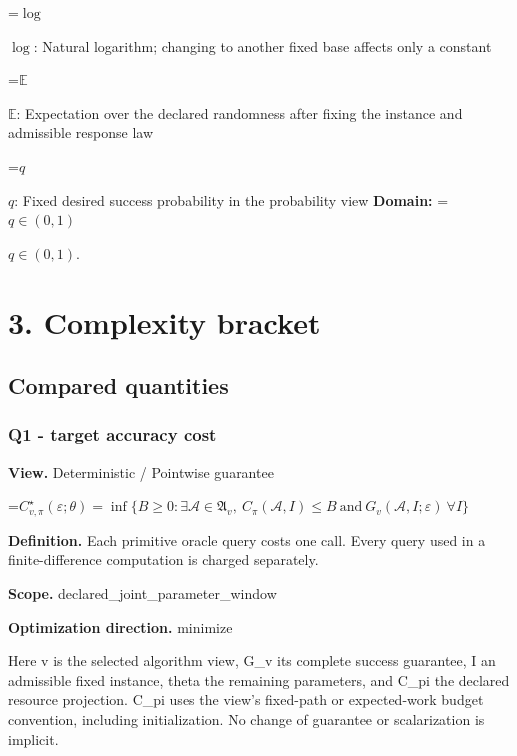 \documentclass[10pt,a4paper]{article}
\newcommand{\AtlasMath}[1]{\par\begingroup\centering\setbox0=\hbox{$\displaystyle #1$}\ifdim\wd0>1.4\linewidth\typeout{ATLAS WIDE FORMULA: \the\wd0}\fi\ifdim\wd0>\linewidth\resizebox{\linewidth}{!}{\box0}\else\box0\fi\par\endgroup}
\newcommand{\AtlasInlineMath}[1]{\begingroup\setbox0=\hbox{$#1$}\ifdim\wd0>.4\linewidth\endgroup\AtlasMath{#1}\else\endgroup$#1$\fi}
\begin{document}
\AtlasInlineMath{\log}: Natural logarithm; changing to another fixed base affects only a constant



\AtlasInlineMath{\mathbb{E}}: Expectation over the declared randomness after fixing the instance and admissible response law



\AtlasInlineMath{q}: Fixed desired success probability in the probability view \textbf{Domain:} \AtlasInlineMath{q\in(0,1)}.



\section{3. Complexity bracket}


\subsection{Compared quantities}


\subsubsection{Q1 - target accuracy cost}


\textbf{View.} Deterministic / Pointwise guarantee



\AtlasMath{C^\star_{v,\pi}(\varepsilon;\theta)=\inf\{B\ge0:\exists\mathcal A\in\mathfrak A_v,\ C_\pi(\mathcal A,I)\le B\ \text{and}\ G_v(\mathcal A,I;\varepsilon)\ \forall I\}}


\textbf{Definition.} Each primitive oracle query costs one call. Every query used in a finite-difference computation is charged separately.



\textbf{Scope.} declared\_joint\_parameter\_window



\textbf{Optimization direction.} minimize



Here v is the selected algorithm view, G\_v its complete success guarantee, I an admissible fixed instance, theta the remaining parameters, and C\_pi the declared resource projection. C\_pi uses the view's fixed-path or expected-work budget convention, including initialization. No change of guarantee or scalarization is implicit.
\end{document}
